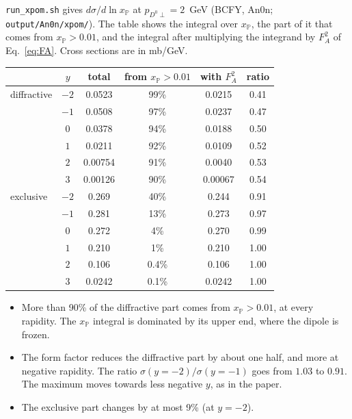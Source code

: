 \documentclass[11pt]{article}
\begin{document}
\texttt{run\_xpom.sh} gives $d\sigma/d\ln x_\mathbb{P}$ at
$p_{D^0\perp}=2$~GeV (BCFY, An0n; \texttt{output/An0n/xpom/}). The table shows
the integral over $x_\mathbb{P}$, the part of it that comes from
$x_\mathbb{P}>0.01$, and the integral after multiplying the integrand by
$F_A^2$ of Eq.~\eqref{eq:FA}. Cross sections are in mb/GeV.
\begin{center}
\begin{tabular}{lccccc}
\toprule
 & $y$ & total & from $x_\mathbb{P}>0.01$ & with $F_A^2$ & ratio \\
\midrule
diffractive & $-2$ & 0.0523  & 99\% & 0.0215  & 0.41 \\
            & $-1$ & 0.0508  & 97\% & 0.0237  & 0.47 \\
            & $0$  & 0.0378  & 94\% & 0.0188  & 0.50 \\
            & $1$  & 0.0211  & 92\% & 0.0109  & 0.52 \\
            & $2$  & 0.00754 & 91\% & 0.0040  & 0.53 \\
            & $3$  & 0.00126 & 90\% & 0.00067 & 0.54 \\
\midrule
exclusive   & $-2$ & 0.269  & 40\% & 0.244  & 0.91 \\
            & $-1$ & 0.281  & 13\% & 0.273  & 0.97 \\
            & $0$  & 0.272  & 4\%  & 0.270  & 0.99 \\
            & $1$  & 0.210  & 1\%  & 0.210  & 1.00 \\
            & $2$  & 0.106  & 0.4\% & 0.106 & 1.00 \\
            & $3$  & 0.0242 & 0.1\% & 0.0242 & 1.00 \\
\bottomrule
\end{tabular}
\end{center}
\begin{itemize}
  \item More than 90\% of the diffractive part comes from
    $x_\mathbb{P}>0.01$, at every rapidity. The $x_\mathbb{P}$ integral is
    dominated by its upper end, where the dipole is frozen.
  \item The form factor reduces the diffractive part by about one half, and
    more at negative rapidity. The ratio
    $\sigma(y=-2)/\sigma(y=-1)$ goes from $1.03$ to $0.91$. The maximum moves
    towards less negative $y$, as in the paper.
  \item The exclusive part changes by at most 9\% (at $y=-2$).
\end{itemize}
\end{document}
